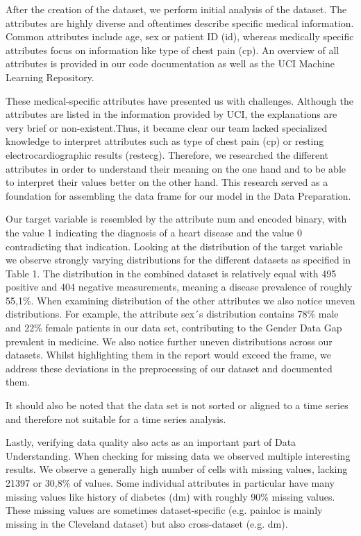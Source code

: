 After the creation of the dataset, we perform initial analysis of the dataset. The attributes are highly diverse and oftentimes describe specific medical information. Common attributes include age, sex or patient ID (id), whereas medically specific attributes focus on information like type of chest pain (cp). An overview of all attributes is provided in our code documentation as well as the UCI Machine Learning Repository. 

These medical-specific attributes have presented us with challenges. Although the attributes are listed in the information provided by UCI, the explanations are very brief or non-existent.Thus, it became clear our team lacked specialized knowledge to interpret attributes such as type of chest pain (cp) or resting electrocardiographic results (restecg). Therefore, we researched the different attributes in order to understand their meaning on the one hand and to be able to interpret their values better on the other hand. This research served as a foundation for assembling the data frame for our model in the Data Preparation. 

Our target variable is resembled by the attribute num and encoded binary, with the value 1 indicating the diagnosis of a heart disease and the value 0 contradicting that indication. Looking at the distribution of the target variable we observe strongly varying distributions for the different datasets as specified in Table 1. The distribution in the combined dataset is relatively equal with 495 positive and 404 negative measurements, meaning a disease prevalence of roughly 55,1\%. When examining distribution of the other attributes we also notice uneven distributions. For example, the attribute sex´s distribution contains 78\% male and 22\% female patients in our data set, contributing to the Gender Data Gap prevalent in medicine. We also notice further uneven distributions across our datasets. Whilst highlighting them in the report would exceed the frame, we address these deviations in the preprocessing of our dataset and documented them.  

It should also be noted that the data set is not sorted or aligned to a time series and therefore not suitable for a time series analysis. 

Lastly, verifying data quality also acts as an important part of Data Understanding. When checking for missing data we observed multiple interesting results. We observe a generally high number of cells with missing values, lacking 21397 or 30,8\% of values. Some individual attributes in particular have many missing values like history of diabetes (dm) with roughly 90\% missing values. These missing values are sometimes dataset-specific (e.g. painloc is mainly missing in the Cleveland dataset) but also cross-dataset (e.g. dm). 

